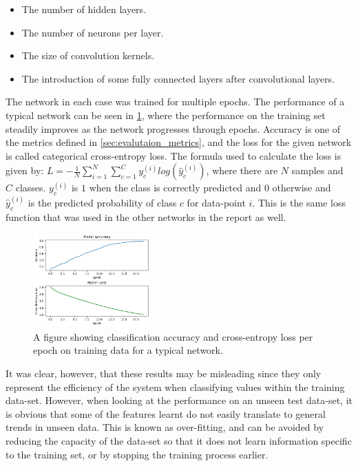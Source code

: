 \begin{itemize}
    \item The number of hidden layers.
    \item The number of neurons per layer.
    \item The size of convolution kernels.
    \item The introduction of some fully connected layers after convolutional layers.
\end{itemize}

The network in each case was trained for multiple epochs. The performance of a typical network can be seen in \cref{fig:accuracy_and_loss_per_epoch}, where the performance on the training set steadily improves as the network progresses through epochs. Accuracy is one of the metrics defined in \cref{sec:evalutaion_metrics}, and the loss for the given network is called categorical cross-entropy loss. The formula used to calculate the loss is given by: $ L = -\frac{1}{N}\sum^N_{i=1}\sum^C_{c=1}y_c^{(i)}log(\hat{y}_c^{(i)}) $, where there are $ N $ samples and $ C $ classes. $ y_c^{(i)} $ is $ 1 $ when the class is correctly predicted and $ 0 $ otherwise and $ \hat{y}_c^{(i)} $ is the predicted probability of class $ c $ for data-point $ i $. This is the same loss function that was used in the other networks in the report as well.

\begin{figure}[htb]
    \centering
    \includegraphics[width=0.4\textwidth]{implementation/images/accuracy_and_loss_per_epoch.png}
    \caption{A figure showing classification accuracy and cross-entropy loss per epoch on training data for a typical network.}
    \label{fig:accuracy_and_loss_per_epoch}
\end{figure}

It was clear, however, that these results may be misleading since they only represent the efficiency of the system when classifying values within the training data-set. However, when looking at the performance on an unseen test data-set, it is obvious that some of the features learnt do not easily translate to general trends in unseen data. This is known as over-fitting, and can be avoided by reducing the capacity of the data-set so that it does not learn information specific to the training set, or by stopping the training process earlier.

